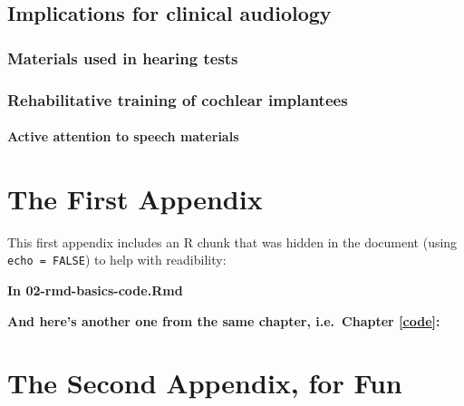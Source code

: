 \documentclass[a4paper, nobind]{templates/ociamthesis}
\newcommand*{\bibtitle}{Works Cited}
\begin{document}
\hypertarget{implications-for-clinical-audiology}{%
\section{Implications for clinical audiology}\label{implications-for-clinical-audiology}}

\hypertarget{materials-used-in-hearing-tests}{%
\subsection{Materials used in hearing tests}\label{materials-used-in-hearing-tests}}

\hypertarget{rehabilitative-training-of-cochlear-implantees}{%
\subsection{Rehabilitative training of cochlear implantees}\label{rehabilitative-training-of-cochlear-implantees}}

\hypertarget{active-attention-to-speech-materials}{%
\subsubsection{Active attention to speech materials}\label{active-attention-to-speech-materials}}

\minitoc 

\startappendices

\hypertarget{the-first-appendix}{%
\chapter{The First Appendix}\label{the-first-appendix}}

This first appendix includes an R chunk that was hidden in the document (using \texttt{echo\ =\ FALSE}) to help with readibility:

\textbf{In 02-rmd-basics-code.Rmd}

\textbf{And here's another one from the same chapter, i.e.~Chapter \ref{code}:}

\hypertarget{the-second-appendix-for-fun}{%
\chapter{The Second Appendix, for Fun}\label{the-second-appendix-for-fun}}


\setlength{\baselineskip}{0pt} %

{\renewcommand*\MakeUppercase[1]{#1}%
\printbibliography[heading=bibintoc,title={\bibtitle}]}
\end{document}
